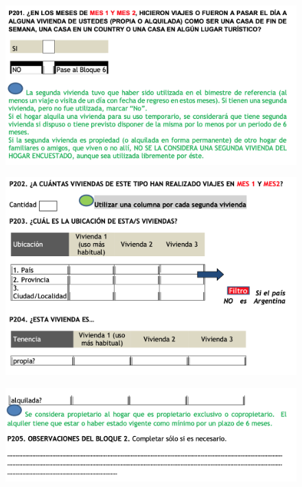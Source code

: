 \documentclass[
  openany]{book}
\begin{document}
\begin{figure}

{\centering \includegraphics[width=1\linewidth]{imagenes/figura6-155} 

}

\end{figure}
\begin{figure}

{\centering \includegraphics[width=1\linewidth]{imagenes/figura6-156} 

}

\end{figure}
\begin{figure}

{\centering \includegraphics[width=1\linewidth]{imagenes/figura6-157} 

}

\end{figure}
\end{document}
